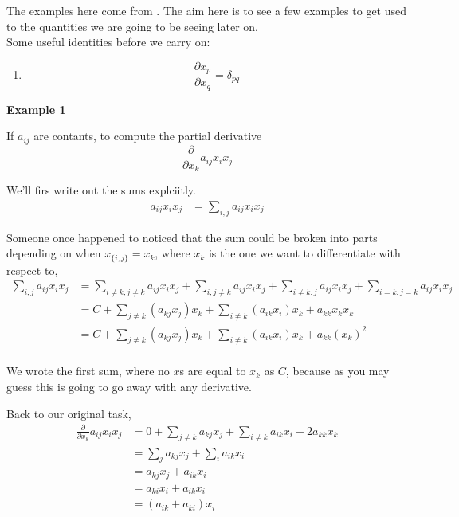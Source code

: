 The examples here come from \cite{tensor-calc}.
The aim here is to see a few examples to get used to the quantities we are going to be seeing later on.
\\

Some useful identities before we carry on:
\begin{enumerate}
    \item
    $$
    \frac{\partial x_p}{\partial x_q} = \delta_{pq}
    $$
\end{enumerate}



\textbf{Example 1}

If $a_{ij}$ are contants, to compute the partial derivative
$$
\frac{\partial}{\partial x_k} a_{ij} x_i x_j
$$

We'll firs write out the sums explciitly.
\begin{align*}
a_{ij} x_i x_j &= \sum_{i,j} a_{ij} x_i x_j
\end{align*}

Someone once happened to noticed that the sum could be broken into parts depending on when $x_{\{i,j\}} = x_k$, where $x_k$
is the one we want to differentiate with respect to,
\begin{align*}
\sum_{i,j} a_{ij} x_i x_j &=
    \sum_{i \neq k, j \neq k} a_{ij} x_i x_j +
    \sum_{i, j \neq k} a_{ij} x_i x_j + 
    \sum_{i \neq k, j} a_{ij} x_i x_j +
    \sum_{i=k, j=k} a_{ij} x_i x_j \\
&= C + \sum_{j \neq k} \left( a_{kj} x_j \right) x_k +
    \sum_{i \neq k} \left( a_{ik} x_i \right) x_k +
    a_{kk} x_k x_k \\
    &= C + \sum_{j \neq k} \left( a_{kj} x_j \right) x_k +
    \sum_{i \neq k} \left( a_{ik} x_i \right) x_k +
    a_{kk} (x_k)^2 \\
\end{align*}

We wrote the first sum, where no $x$s are equal to $x_k$ as $C$, because as you may guess this is going to go away with
any derivative.

Back to our original task,
\begin{align*}
\frac{\partial}{\partial x_k} a_{ij} x_i x_j &=
    0 + \sum_{j \neq k} a_{kj} x_j +
    \sum_{i \neq k} a_{ik} x_i +
    2 a_{kk} x_k \\
&= \sum_{j} a_{kj} x_j + \sum_{i} a_{ik} x_i \\
&= a_{kj} x_j + a_{ik} x_i \\
&= a_{ki} x_i + a_{ik} x_i \\
&= (a_{ik} + a_{ki}) x_i
\end{align*}



